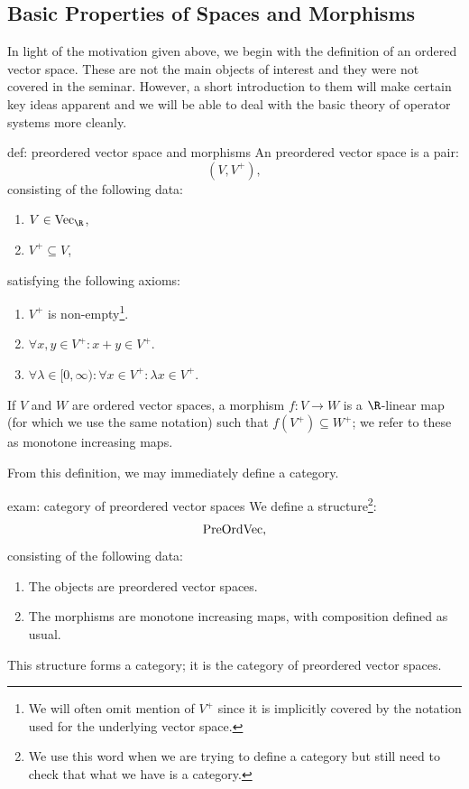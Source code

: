 \documentclass[main.tex]{subfiles}
\begin{document}
\subsection{Basic Properties of Spaces and Morphisms}
\label{subsec:matrix-ordered-spaces-I}


In light of the motivation given above, we begin with the definition of an ordered vector space. These are not the main objects of interest and they were not covered in the seminar. However, a short introduction to them will make certain key ideas apparent and we will be able to deal with the basic theory of operator systems more cleanly. 

\begin{definition}{}{def: preordered vector space and morphisms}
An preordered vector space is a pair:
\[(V,V^+),\] 
consisting of the following data:
\begin{enumerate}
    \item $V \in \Vect{\R}$,
    \item $V^+ \subseteq V$,
\end{enumerate}
satisfying the following axioms:
\begin{enumerate}
    \item $V^+$ is non-empty\footnote{We will often omit mention of $V^+$ since it is implicitly covered by the notation used for the underlying vector space.}. 
    \item $\forall x,y \in V^+: x+y \in V^+$.
    \item $\forall \lambda \in [0,\infty): \forall x \in V^+: \lambda x \in V^+$. 
\end{enumerate}
If $V$ and $W$ are ordered vector spaces, a morphism $f: V \to W$ is a $\R$-linear map (for which we use the same notation) such that $f(V^+) \subseteq W^+$; we refer to these as monotone increasing maps.  
\end{definition}

From this definition, we may immediately define a category. 

\begin{example}{}{exam: category of preordered vector spaces}
We define a structure\footnote{We use this word when we are trying to define a category but still need to check that what we have is a category.}:
\[\text{PreOrdVec},\] 
consisting of the following data:
\begin{enumerate}
    \item The objects are preordered vector spaces. 
    \item The morphisms are monotone increasing maps, with composition defined as usual.
\end{enumerate}
This structure forms a category; it is the category of preordered vector spaces. 
\end{example}
\end{document}
